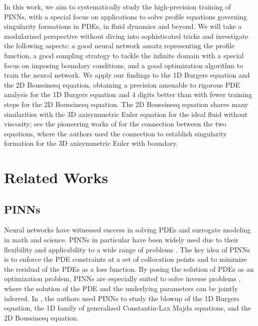 \documentclass[12pt]{caltech_thesis}
\numberwithin{equation}{section}
\begin{document}
In this work, we aim to systematically study the high-precision training of PINNs,
with a special focus on applications  to solve profile equations governing singularity formations
in PDEs, in fluid dynamics and beyond. We will take a modularized perspective without diving 
into sophisticated tricks and investigate the following aspects:
a good neural network ansatz representing the profile function, a good sampling strategy to tackle
the infinite domain with a special focus on imposing boundary conditions,
and a good optimization algorithm to train the neural network. 
We apply our findings to the 1D Burgers equation and the 2D Boussinesq equation, 
obtaining a precision amenable to rigorous PDE analysis for the 1D Burgers equation 
and $4$ digits better than \cite{wang2023asymptotic} with fewer training steps for the 2D Boussinesq equation.
The 2D Boussinesq equation shares many similarities with the 3D axisymmetric Euler equation for the ideal
fluid without viscosity; see the pioneering works of \cite{chen2021finite,chen2022stable,chen2025stable} for the connection between the two equations,
where the authors used the connection to establish singularity formation for the 3D axisymmetric Euler with boundary.


\section{Related Works}
\subsection{PINNs}
Neural networks have witnessed success in solving PDEs and surrogate modeling in math and science.
PINNs in particular have been widely used due to their flexibility and applicability to a wide range of problems \cite{cai2021physics, raissi2019physics, karniadakis2021physics}.
The key idea of PINNs is to enforce the PDE constraints at a set of collocation points and to minimize the residual
of the PDEs as a loss function. By posing the solution of PDEs as an optimization problem, PINNs are especially suited
to solve inverse problems \cite{raissi2020hidden, yuan2022pinn, lu2021physics, yu2022gradient}, where the solution of the PDE and the underlying parameters can be jointly inferred.
In \cite{wang2023asymptotic}, the authors used PINNs to study the blowup of the 1D Burgers equation, 
the 1D family of generalized Constantin-Lax Majda equations, and the 2D Boussinesq equation.
\end{document}

